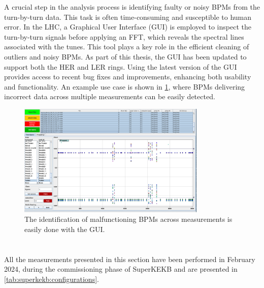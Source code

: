 A crucial step in the analysis process is identifying faulty or noisy BPMs from the turn-by-turn
data. This task is often time-consuming and susceptible to human error. In the LHC, a Graphical User
Interface (GUI) is employed to inspect the turn-by-turn signals before applying an FFT, which
reveals the spectral lines associated with the tunes. This tool plays a key role in the efficient
cleaning of outliers and noisy BPMs. As part of this thesis, the GUI has been updated to support
both the HER and LER rings. Using the latest version of the GUI provides access to recent bug fixes
and improvements, enhancing both usability and functionality. An example use case is shown in
\cref{fig:kek:gui_bad_bpms}, where BPMs delivering incorrect data across multiple measurements can
be easily detected.

\begin{figure}[!htb]
    \centering
    \includegraphics[width=0.8\textwidth]{./images/kek/GUIbadbpm.png}
    \caption{The identification of malfunctioning BPMs across measurements is easily done with the GUI.}
    \label{fig:kek:gui_bad_bpms}
\end{figure}



\FloatBarrier
\section{}

All the measurements presented in this section have been performed in February 2024, during the
commissioning phase of SuperKEKB and are presented in \cref{tab:superkekb:configurations}.

\subsection{}

